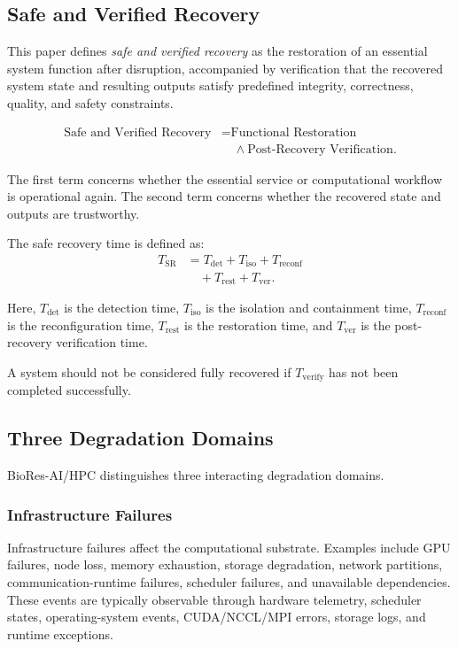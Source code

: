 \documentclass[conference]{IEEEtran}
\begin{document}
\subsection{Safe and Verified Recovery}

This paper defines \emph{safe and verified recovery} as the restoration of an essential system function after disruption, accompanied by verification that the recovered system state and resulting outputs satisfy predefined integrity, correctness, quality, and safety constraints.

\begin{equation}
\begin{split}
\text{Safe and Verified Recovery}
&= \text{Functional Restoration} \\
&\quad \land \text{Post-Recovery Verification}.
\end{split}
\label{eq:safe-verified-recovery}
\end{equation}


The first term concerns whether the essential service or computational workflow is operational again. The second term concerns whether the recovered state and outputs are trustworthy.

The safe recovery time is defined as:
\begin{equation}
\begin{aligned}
T_{\mathrm{SR}}
&= T_{\mathrm{det}}
 + T_{\mathrm{iso}}
 + T_{\mathrm{reconf}} \\
&\quad + T_{\mathrm{rest}}
 + T_{\mathrm{ver}}.
\end{aligned}
\label{eq:safe-recovery-time}
\end{equation}

Here, $T_{\mathrm{det}}$ is the detection time,
$T_{\mathrm{iso}}$ is the isolation and containment time,
$T_{\mathrm{reconf}}$ is the reconfiguration time,
$T_{\mathrm{rest}}$ is the restoration time, and
$T_{\mathrm{ver}}$ is the post-recovery verification time.

A system should not be considered fully recovered if $T_{\mathrm{verify}}$ has not been completed successfully.

\subsection{Three Degradation Domains}

BioRes-AI/HPC distinguishes three interacting degradation domains.

\subsubsection{Infrastructure Failures}
Infrastructure failures affect the computational substrate. Examples include GPU failures, node loss, memory exhaustion, storage degradation, network partitions, communication-runtime failures, scheduler failures, and unavailable dependencies. These events are typically observable through hardware telemetry, scheduler states, operating-system events, CUDA/NCCL/MPI errors, storage logs, and runtime exceptions.
\end{document}
